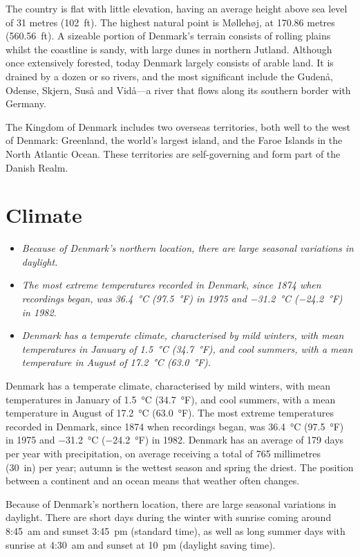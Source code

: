The country is flat with little elevation, having an average height
above sea level of 31 metres (102~ft). The highest natural point is
Møllehøj, at 170.86 metres (560.56~ft). A sizeable portion of Denmark's
terrain consists of rolling plains whilst the coastline is sandy, with
large dunes in northern Jutland. Although once extensively forested,
today Denmark largely consists of arable land. It is drained by a dozen
or so rivers, and the most significant include the Gudenå, Odense,
Skjern, Suså and Vidå---a river that flows along its southern border
with Germany.

The Kingdom of Denmark includes two overseas territories, both well to
the west of Denmark: Greenland, the world's largest island, and the
Faroe Islands in the North Atlantic Ocean. These territories are
self-governing and form part of the Danish Realm.

\section{Climate}\label{climate}

\begin{itemize}
\item
  \emph{Because of Denmark's northern location, there are large seasonal
  variations in daylight.}
\item
  \emph{The most extreme temperatures recorded in Denmark, since 1874
  when recordings began, was 36.4~°C (97.5~°F) in 1975 and −31.2~°C
  (−24.2~°F) in 1982.}
\item
  \emph{Denmark has a temperate climate, characterised by mild winters,
  with mean temperatures in January of 1.5~°C (34.7~°F), and cool
  summers, with a mean temperature in August of 17.2~°C (63.0~°F).}
\end{itemize}

Denmark has a temperate climate, characterised by mild winters, with
mean temperatures in January of 1.5~°C (34.7~°F), and cool summers, with
a mean temperature in August of 17.2~°C (63.0~°F). The most extreme
temperatures recorded in Denmark, since 1874 when recordings began, was
36.4~°C (97.5~°F) in 1975 and −31.2~°C (−24.2~°F) in 1982. Denmark has
an average of 179 days per year with precipitation, on average receiving
a total of 765 millimetres (30~in) per year; autumn is the wettest
season and spring the driest. The position between a continent and an
ocean means that weather often changes.

Because of Denmark's northern location, there are large seasonal
variations in daylight. There are short days during the winter with
sunrise coming around 8:45~am and sunset 3:45~pm (standard time), as
well as long summer days with sunrise at 4:30~am and sunset at 10~pm
(daylight saving time).

